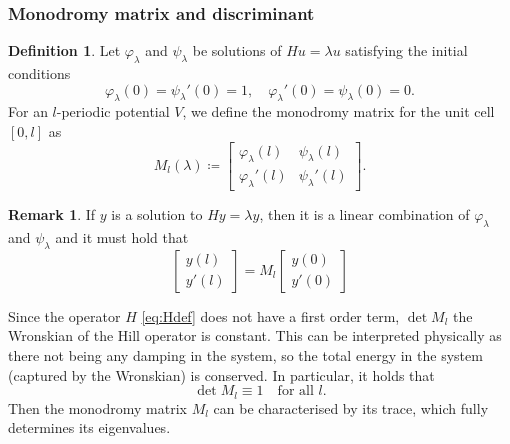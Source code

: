 \documentclass[a4paper]{article}
\theoremstyle{definition}
\newtheorem{definition}[theorem]{Definition}
\newtheorem{remark}[theorem]{Remark}%
\numberwithin{equation}{section}
\numberwithin{theorem}{section}
\begin{document}
{\subsubsection{Monodromy matrix and discriminant}

\begin{definition}
    Let $\varphi_\lambda$ and $\psi_\lambda$ be solutions of $Hu=\lambda u$ satisfying the initial conditions
    \begin{equation} \label{eq:basis_solutions_bc}
        \varphi_\lambda(0)=\psi_\lambda'(0)=1,\quad \varphi_\lambda'(0)=\psi_\lambda(0)=0.
    \end{equation}
    For an $l$-periodic potential $V$, we define the monodromy matrix for the unit cell $[0,l]$ as
    \begin{equation} \label{eq:MonodMatDefn}
        M_l(\lambda)\coloneq\begin{bmatrix}
    \varphi_\lambda(l) & \psi_\lambda(l) \\
    \varphi_\lambda'(l) & \psi_\lambda'(l) 
    \end{bmatrix}.
    \end{equation}
\end{definition}
\begin{remark} \label{rmk:monodromy_action}
    If $y$ is a solution to $Hy=\lambda y$, then it is a linear combination of $\varphi_\lambda$ and $\psi_\lambda$ and it must hold that
    \begin{equation*}
        \begin{bmatrix}
            y(l) \\
            y'(l)
        \end{bmatrix} = M_l\begin{bmatrix}
            y(0) \\
            y'(0)
        \end{bmatrix}
    \end{equation*}
\end{remark}

Since the operator $H$ \eqref{eq:Hdef} does not have a first order term, $\det M_l$ the Wronskian of the Hill operator is constant. This can be interpreted physically as there not being any damping in the system, so the total energy in the system (captured by the Wronskian) is conserved. In particular, it holds that
\begin{equation} \label{eq:det=1}
    \det M_l\equiv 1\quad\text{for all $l$.}
\end{equation}
Then the monodromy matrix $M_l$ can be characterised by its trace, which fully determines its eigenvalues.

}
\end{document}

